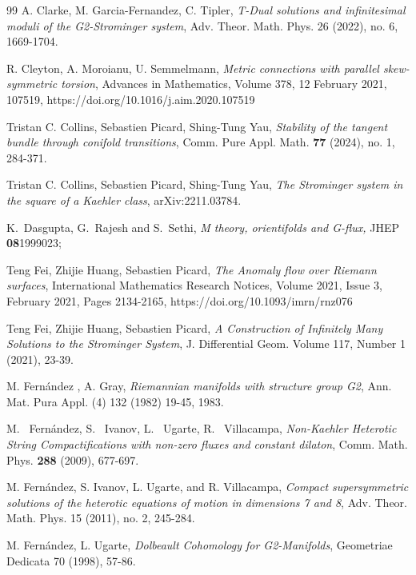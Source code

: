 \documentclass[10pt,british]{article}
\begin{document}
\begin{thebibliography}{99}
      A. Clarke, M. Garcia-Fernandez, C. Tipler, \emph{ T-Dual solutions and infinitesimal moduli of the G2-Strominger system},   Adv. Theor. Math. Phys. 26 (2022), no. 6, 1669-1704. %
   
 

R. Cleyton, A. Moroianu, U. Semmelmann, \emph{Metric connections with parallel skew-symmetric torsion}, Advances in Mathematics, Volume 378, 12 February 2021, 107519, https://doi.org/10.1016/j.aim.2020.107519

 Tristan C. Collins, Sebastien Picard, Shing-Tung Yau, \emph{Stability of the tangent bundle through conifold transitions}, Comm. Pure Appl. Math. \textbf{77} (2024), no. 1, 284-371.%

  Tristan C. Collins, Sebastien Picard, Shing-Tung Yau, \emph{The Strominger system in the square of a Kaehler class},  arXiv:2211.03784.


  K.~Dasgupta, G.~Rajesh and S.~Sethi,
  \textit{M theory, orientifolds and G-flux,}
   JHEP {\bf 08}{1999}{023}; %
   
     Teng Fei, Zhijie Huang, Sebastien Picard, \emph{The Anomaly
flow over Riemann surfaces},  International Mathematics Research Notices, Volume 2021, Issue 3, February 2021, Pages 2134-2165, https://doi.org/10.1093/imrn/rnz076 %

 Teng Fei, Zhijie Huang, Sebastien Picard, \emph{A
Construction of Infinitely Many Solutions to the Strominger
System},  J. Differential Geom.  Volume 117, Number 1 (2021), 23-39. %

 M. Fern\'andez , A. Gray, \emph{Riemannian manifolds with structure group G2}, Ann. Mat. Pura Appl. (4) 132 (1982) 19-45, 1983.

 M.~ Fern\'andez, S.~ Ivanov, L.~ Ugarte, R.~ Villacampa, \emph{Non-Kaehler Heterotic String Compactifications with
non-zero fluxes and constant dilaton},  Comm. Math. Phys. {\bf 288} (2009), 677-697.

 M. Fern\'andez, S. Ivanov, L. Ugarte, and R. Villacampa, \emph{Compact supersymmetric solutions of the heterotic equations of
motion in dimensions 7 and 8}, Adv. Theor. Math. Phys. 15 (2011), no. 2, 245-284.

 M. Fern\'andez, L. Ugarte, \emph{Dolbeault Cohomology for G2-Manifolds}, Geometriae Dedicata 70 (1998), 57-86.


\end{thebibliography}
\end{document}
